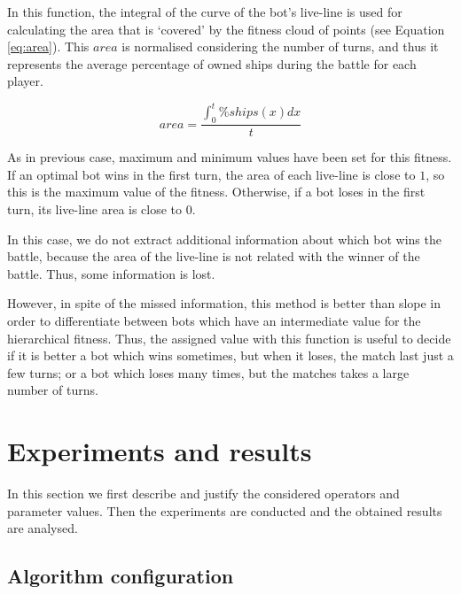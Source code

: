 \documentclass[preprint]{elsarticle}
\begin{document}
In this function, the integral of the curve of the bot's live-line is used for calculating the area that is `covered' by the fitness cloud of points (see Equation \ref{eq:area}). This {$area$} is normalised considering the number of turns, and thus it represents the average percentage of owned ships during the battle for each player. 

\begin{equation}
        area=\frac{\int_{0}^{t}\%ships(x)dx}{t}
    \label{eq:area}
\end{equation}

As in previous case, maximum and minimum values have been set for this fitness. If an optimal bot wins in the first turn, the area of each live-line is close to {$1$}, so this is the maximum value of the fitness. Otherwise, if a bot loses in the first turn, its live-line area is close to {$0$}. 

In this case, we do not extract additional information about which bot wins the battle, because the area of the live-line is not related with the winner of the battle. Thus, some information is lost. 

However, in spite of the missed information, this method is better than slope in order to differentiate between bots which have an intermediate value for the hierarchical fitness. Thus, the assigned value with this function is useful to decide if it is better a bot which wins sometimes, but when it loses, the match last just a few turns; or a bot which loses many times, but the matches takes a large number of turns.



\section{Experiments and results}
\label{sec:experiments}

In this section we first describe and justify the considered operators and parameter values. Then the experiments are conducted and the obtained results are analysed.

\subsection{Algorithm configuration}
\label{subsec:alg_config}
\end{document}
